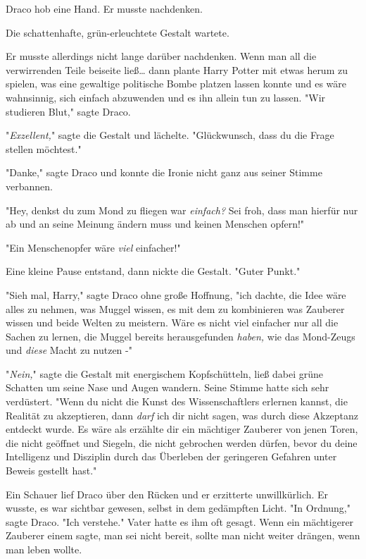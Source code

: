 {Draco hob eine Hand. Er musste nachdenken.

Die schattenhafte, grün-erleuchtete Gestalt wartete.

Er musste allerdings nicht lange darüber nachdenken. Wenn man all die verwirrenden Teile beiseite ließ… dann plante Harry Potter mit etwas herum zu spielen, was eine gewaltige politische Bombe platzen lassen konnte und es wäre wahnsinnig, sich einfach abzuwenden und es ihn allein tun zu lassen. "Wir studieren Blut," sagte Draco.

"\emph{Exzellent,}" sagte die Gestalt und lächelte. "Glückwunsch, dass du die Frage stellen möchtest."

"Danke," sagte Draco und konnte die Ironie nicht ganz aus seiner Stimme verbannen.

"Hey, denkst du zum Mond zu fliegen war \emph{einfach?} Sei froh, dass man hierfür nur ab und an seine Meinung ändern muss und keinen Menschen opfern!"

"Ein Menschenopfer wäre \emph{viel} einfacher!"

Eine kleine Pause entstand, dann nickte die Gestalt. "Guter Punkt."

"Sieh mal, Harry," sagte Draco ohne große Hoffnung, "ich dachte, die Idee wäre alles zu nehmen, was Muggel wissen, es mit dem zu kombinieren was Zauberer wissen und beide Welten zu meistern. Wäre es nicht viel einfacher nur all die Sachen zu lernen, die Muggel bereits herausgefunden \emph{haben,} wie das Mond-Zeugs und \emph{diese} Macht zu nutzen -"

"\emph{Nein,}" sagte die Gestalt mit energischem Kopfschütteln, ließ dabei grüne Schatten um seine Nase und Augen wandern. Seine Stimme hatte sich sehr verdüstert. "Wenn du nicht die Kunst des Wissenschaftlers erlernen kannst, die Realität zu akzeptieren, dann \emph{darf} ich dir nicht sagen, was durch diese Akzeptanz entdeckt wurde. Es wäre als erzählte dir ein mächtiger Zauberer von jenen Toren, die nicht geöffnet und Siegeln, die nicht gebrochen werden dürfen, bevor du deine Intelligenz und Disziplin durch das Überleben der geringeren Gefahren unter Beweis gestellt hast."

Ein Schauer lief Draco über den Rücken und er erzitterte unwillkürlich. Er wusste, es war sichtbar gewesen, selbst in dem gedämpften Licht. "In Ordnung," sagte Draco. "Ich verstehe." Vater hatte es ihm oft gesagt. Wenn ein mächtigerer Zauberer einem sagte, man sei nicht bereit, sollte man nicht weiter drängen, wenn man leben wollte.

}
